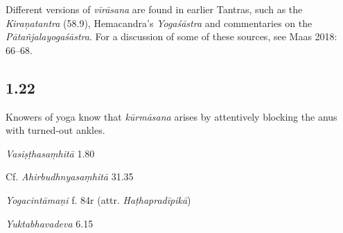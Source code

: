 \begin{ekdosis}
\begin{philcomm}[hp01_021]
Different versions of \emph{vīrāsana} are found in earlier Tantras, such as the \emph{Kiraṇatantra} (58.9), Hemacandra’s \emph{Yogaśāstra} and commentaries on the \emph{Pātañjalayogaśāstra}. For a discussion of some of these sources, see Maas 2018: 66–68.
\end{philcomm}

\subsection*{1.22}
\begin{translation}[hp01_022]
Knowers of yoga know that \emph{kūrmāsana} arises by attentively blocking the anus with turned-out ankles.
\end{translation}

\begin{sources}[hp01_022]
\emph{Vasiṣṭhasaṃhitā} 1.80

\begin{versinnote}
\end{versinnote}

Cf. \emph{Ahirbudhnyasaṃhitā} 31.35

\begin{versinnote}
\end{versinnote}

\end{sources}

\begin{testimonia}[hp01_022]
\emph{Yogacintāmaṇi} f. 84r (attr. \emph{Haṭhapradīpikā})

\begin{versinnote}
\end{versinnote}

\emph{Yuktabhavadeva} 6.15

\begin{versinnote}
\end{versinnote}


\end{testimonia}
\end{ekdosis}
